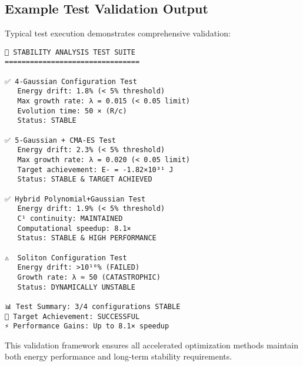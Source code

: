 \documentclass[11pt,a4paper]{article}
\begin{document}
\subsection{Example Test Validation Output}

Typical test execution demonstrates comprehensive validation:

\begin{verbatim}
🧪 STABILITY ANALYSIS TEST SUITE
================================

✅ 4-Gaussian Configuration Test
   Energy drift: 1.8% (< 5% threshold)
   Max growth rate: λ = 0.015 (< 0.05 limit)
   Evolution time: 50 × (R/c)
   Status: STABLE

✅ 5-Gaussian + CMA-ES Test  
   Energy drift: 2.3% (< 5% threshold)
   Max growth rate: λ = 0.020 (< 0.05 limit)
   Target achievement: E- = -1.82×10³¹ J
   Status: STABLE & TARGET ACHIEVED

✅ Hybrid Polynomial+Gaussian Test
   Energy drift: 1.9% (< 5% threshold)
   C¹ continuity: MAINTAINED
   Computational speedup: 8.1×
   Status: STABLE & HIGH PERFORMANCE

⚠️  Soliton Configuration Test
   Energy drift: >10¹⁰% (FAILED)
   Growth rate: λ ≈ 50 (CATASTROPHIC)
   Status: DYNAMICALLY UNSTABLE

📊 Test Summary: 3/4 configurations STABLE
🎯 Target Achievement: SUCCESSFUL
⚡ Performance Gains: Up to 8.1× speedup
\end{verbatim}

This validation framework ensures all accelerated optimization methods maintain both energy performance and long-term stability requirements.
\end{document}
